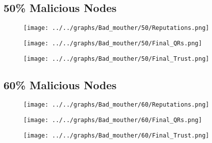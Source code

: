 \begin{minipage}[t]{0.49\columnwidth}
\subsection*{50\% Malicious Nodes}
    \begin{figure}[H]
        \centering
        \texttt{[image: ../../graphs/Bad\_mouther/50/Reputations.png]}
    \end{figure}
    \begin{figure}[H]
        \centering
        \texttt{[image: ../../graphs/Bad\_mouther/50/Final\_QRs.png]}
    \end{figure}
\end{minipage}
\begin{minipage}[t]{0.49\columnwidth}
    \begin{figure}[H]
        \centering
        \texttt{[image: ../../graphs/Bad\_mouther/50/Final\_Trust.png]}
    \end{figure}
\end{minipage}

\begin{minipage}[t]{0.49\columnwidth}
\subsection*{60\% Malicious Nodes}
    \begin{figure}[H]
        \centering
        \texttt{[image: ../../graphs/Bad\_mouther/60/Reputations.png]}
    \end{figure}
    \begin{figure}[H]
        \centering
        \texttt{[image: ../../graphs/Bad\_mouther/60/Final\_QRs.png]}
    \end{figure}
\end{minipage}
\begin{minipage}[t]{0.49\columnwidth}
    \begin{figure}[H]
        \centering
        \texttt{[image: ../../graphs/Bad\_mouther/60/Final\_Trust.png]}
    \end{figure}
\end{minipage}

